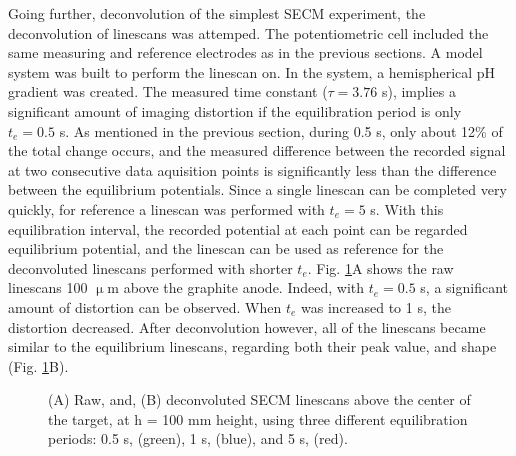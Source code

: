 Going further, deconvolution of the simplest SECM experiment, the deconvolution of linescans was attemped.
The potentiometric cell included the same measuring and reference electrodes as in the previous sections.
A model system was built to perform the linescan on.
In the system, a hemispherical pH gradient was created.
The measured time constant ($\tau = 3.76$ s), implies a significant amount of imaging distortion if the equilibration period is only $t_e = 0.5$ s.
As mentioned in the previous section, during 0.5 s, only about 12\% of the total change occurs, and the measured difference between the recorded signal at two consecutive data aquisition points is significantly less than the difference between the equilibrium potentials.
Since a single linescan can be completed very quickly, for reference a linescan was performed with $t_e = 5$ s.
With this equilibration interval, the recorded potential at each point can be regarded equilibrium potential, and the linescan can be used as reference for the deconvoluted linescans performed with shorter $t_e$.
Fig. \ref{fig:lines_pH}A shows the raw linescans 100 $\upmu$m above the graphite anode.
Indeed, with $t_e = 0.5$ s, a significant amount of distortion can be observed.
When $t_e$ was increased to 1 s, the distortion decreased.
After deconvolution however, all of the linescans became similar to the equilibrium linescans, regarding both their peak value, and shape (Fig. \ref{fig:lines_pH}B).


\begin{figure}
\centering
{}
\caption[Raw and deconvoluted SECM linescans with the antimony microelectrode.]{(A) Raw, and, (B) deconvoluted SECM linescans above the center of the target, at h = 100 mm height, using three different equilibration periods: 0.5 s, (green), 1 s, (blue), and 5 s, (red).}
\label{fig:lines_pH}
\end{figure}

